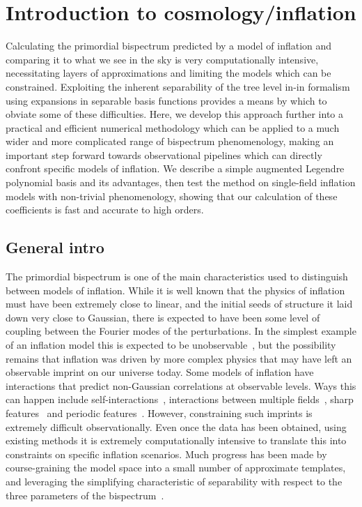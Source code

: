 %
\chapter{Introduction to cosmology/inflation}
Calculating the primordial bispectrum predicted by a model of inflation and
comparing it to what we see in the sky is very computationally intensive, necessitating layers
of approximations and limiting the models which can be constrained.  Exploiting the inherent separability
of the tree level in-in formalism using expansions in separable basis functions provides a means by which to
obviate some of these difficulties. Here, we develop this approach further into a practical and efficient
numerical methodology which can be applied to a much wider and more complicated range of bispectrum
phenomenology, making an important step forward towards observational pipelines which can directly
confront specific models of inflation.  We describe a simple augmented Legendre polynomial basis
and its advantages, then test the method on single-field inflation models with non-trivial phenomenology,
showing that our calculation of these coefficients is fast and accurate to high orders.

\section{General intro}\label{sec:general_intro}
The primordial bispectrum is one of the main
characteristics used to distinguish between models of inflation. While it is well
known that the physics of inflation must have been extremely close
to linear, and the initial seeds of structure it laid down
very close to Gaussian, there is expected to have been some level of coupling
between the Fourier modes of the perturbations.
In the simplest example of an inflation model this is
expected to be unobservable~\cite{Maldacena},
but the possibility remains that inflation was driven by
more complex physics that may have left an observable imprint on our universe today.
Some models of inflation have interactions that predict non-Gaussian
correlations at observable levels. Ways this can happen include
self-interactions~\cite{px_burrage,dbi_in_the_sky},
interactions between multiple fields~\cite{Byrnes_2010},
sharp features~\cite{adshead}
and periodic features~\cite{flauger_pajer_resonant}.
However, constraining such imprints is extremely difficult observationally.
Even once the data has been obtained, using existing methods it is
extremely computationally intensive to translate this into constraints
on specific inflation scenarios. Much progress has been made by course-graining
the model space into a small number of approximate templates,
and leveraging the simplifying characteristic of separability
with respect to the three parameters of the bispectrum~\cite{Komatsu_2005, Munchmeyer_2014}.


